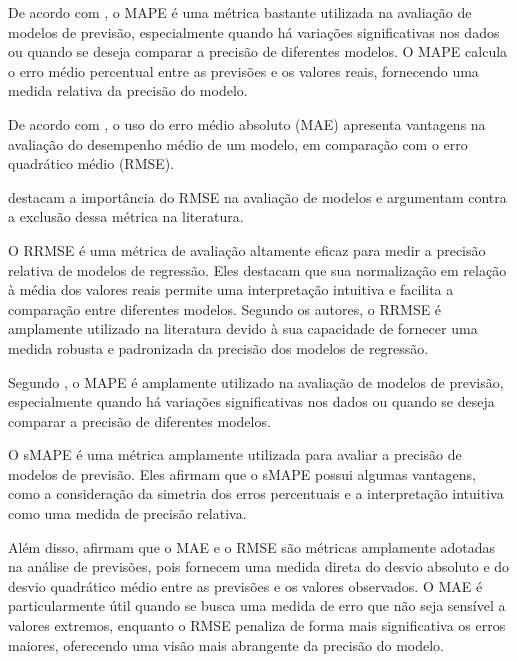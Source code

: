 De acordo com , o MAPE é uma métrica bastante utilizada na avaliação de modelos de previsão, especialmente quando há variações significativas nos dados ou quando se deseja comparar a precisão de diferentes modelos. O MAPE calcula o erro médio percentual entre as previsões e os valores reais, fornecendo uma medida relativa da precisão do modelo.

De acordo com , o uso do erro médio absoluto (MAE) apresenta vantagens na avaliação do desempenho médio de um modelo, em comparação com o erro quadrático médio (RMSE).

 destacam a importância do RMSE na avaliação de modelos e argumentam contra a exclusão dessa métrica na literatura.


\begin{quoting}[rightmargin=0cm,leftmargin=4cm]
	\begin{singlespace}
		{\footnotesize \noindent O RRMSE é uma métrica de avaliação altamente eficaz para medir a precisão relativa de modelos de regressão. Eles destacam que sua normalização em relação à média dos valores reais permite uma interpretação intuitiva e facilita a comparação entre diferentes modelos. Segundo os autores, o RRMSE é amplamente utilizado na literatura devido à sua capacidade de fornecer uma medida robusta e padronizada da precisão dos modelos de regressão. \cite{lopes2020evaluation} }
	\end{singlespace}
\end{quoting}


Segundo , o MAPE é amplamente utilizado na avaliação de modelos de previsão, especialmente quando há variações significativas nos dados ou quando se deseja comparar a precisão de diferentes modelos.

\begin{quoting}[rightmargin=0cm,leftmargin=4cm]
	\begin{singlespace}
		{\footnotesize \noindent  O sMAPE é uma métrica amplamente utilizada para avaliar a precisão de modelos de previsão. Eles afirmam que o sMAPE possui algumas vantagens, como a consideração da simetria dos erros percentuais e a interpretação intuitiva como uma medida de precisão relativa.\cite{nguyen2020toxicological} }
	\end{singlespace}
\end{quoting}

Além disso,  afirmam que o MAE e o RMSE são métricas amplamente adotadas na análise de previsões, pois fornecem uma medida direta do desvio absoluto e do desvio quadrático médio entre as previsões e os valores observados. O MAE é particularmente útil quando se busca uma medida de erro que não seja sensível a valores extremos, enquanto o RMSE penaliza de forma mais significativa os erros maiores, oferecendo uma visão mais abrangente da precisão do modelo.


